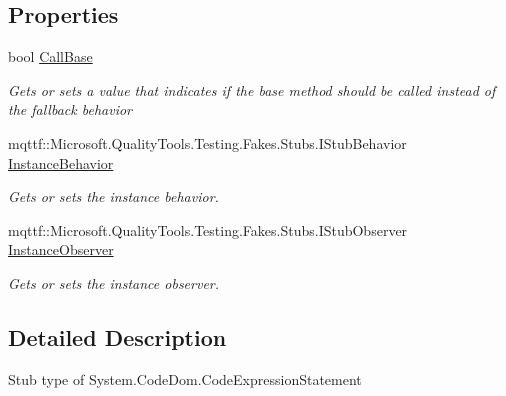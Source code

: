 \subsection*{Properties}
\begin{DoxyCompactItemize}
\item 
bool \hyperlink{class_system_1_1_code_dom_1_1_fakes_1_1_stub_code_expression_statement_a6264aad7c387512ff8ffdc572c38436a}{Call\-Base}
\begin{DoxyCompactList}\small\item\em Gets or sets a value that indicates if the base method should be called instead of the fallback behavior\end{DoxyCompactList}\item 
mqttf\-::\-Microsoft.\-Quality\-Tools.\-Testing.\-Fakes.\-Stubs.\-I\-Stub\-Behavior \hyperlink{class_system_1_1_code_dom_1_1_fakes_1_1_stub_code_expression_statement_ad30d6ce0ff42272d1b09adaf37bd3957}{Instance\-Behavior}
\begin{DoxyCompactList}\small\item\em Gets or sets the instance behavior.\end{DoxyCompactList}\item 
mqttf\-::\-Microsoft.\-Quality\-Tools.\-Testing.\-Fakes.\-Stubs.\-I\-Stub\-Observer \hyperlink{class_system_1_1_code_dom_1_1_fakes_1_1_stub_code_expression_statement_a5383233354b4c54d76359a0e1c61f07a}{Instance\-Observer}
\begin{DoxyCompactList}\small\item\em Gets or sets the instance observer.\end{DoxyCompactList}\end{DoxyCompactItemize}


\subsection{Detailed Description}
Stub type of System.\-Code\-Dom.\-Code\-Expression\-Statement



